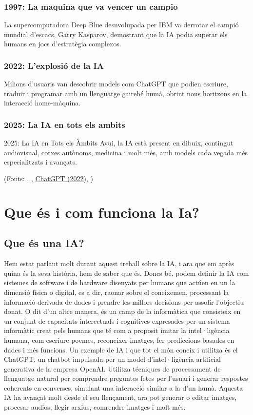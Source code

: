 \subsubsection{1997: La maquina que va vencer un campio}
 La supercomputadora Deep Blue desnvolupada per IBM va derrotar el campió mundial d’escacs, Garry Kasparov, demostrant que la IA podia superar els humans en jocs d’estratègia complexos.
\subsubsection{2022: L'explosió de la IA}
Milions d’usuaris van descobrir models com ChatGPT que podien escriure, traduir i programar amb un llenguatge gairebé humà, obrint nous horitzons en la interacció home-màquina.
\subsubsection{2025: La IA en tots els ambits}
    2025: La IA en Tots els Àmbits
    Avui, la IA està present en dibuix, contingut audiovisual, cotxes autònoms, medicina i molt més, amb models cada vegada més especialitzats i avançats.



(Fonts: \cite{McCarthy_Minsky_Rochester_Shannon_2006}, \cite{deep-blue},
\href{https://openai.com/index/chatgpt/}{ChatGPT (2022)},
\cite{10.1093/mind/LIX.236.433}
)

\section{Que és i com funciona la Ia?}
\subsection{Que és una IA?}
Hem estat parlant molt durant aquest treball sobre la IA, i ara que em après quina és la seva història, hem de saber que és. Doncs bé, podem definir la IA com sistemes de software i de hardware disenyats per humans que actúen en un la dimensió física o digital, es a dir, raonar sobre el coneixemen, processant la informació derivada de dades i prendre les millors decisions per assolir l'objectiu donat. O dit d'un altre manera, és un camp de la informàtica que consisteix en un conjunt de capacitats interectuals i cognitives expresades per un sistema informàtic creat pels humans que té com a proposit imitar la intel·ligència humana, com escriure poemes, reconeixer imatges, fer prediccions basades en dades i més funcions. Un exemple de IA i que tot el món coneix i utilitza és el ChatGPT, un chatbot impulsada per un model d'intel·ligència artificial generativa de la empresa OpenAI. Utilitza técniques de processament de llenguatge natural per comprendre preguntes fetes per l'usuari i generar respostes coherents en converses, simulant una interacció similar a la d'un humà. Aquesta IA ha avançat molt desde el seu llençament, ara pot generar o editar imatges, procesar audios, llegir arxius, comrendre imatges i molt més.

